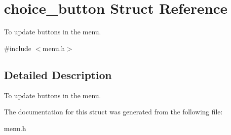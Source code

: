 \hypertarget{structchoice__button}{}\section{choice\+\_\+button Struct Reference}
\label{structchoice__button}


To update buttons in the menu.  




{\ttfamily \#include $<$menu.\+h$>$}



\subsection{Detailed Description}
To update buttons in the menu. 

The documentation for this struct was generated from the following file\+:\begin{DoxyCompactItemize}
\item 
menu.\+h\end{DoxyCompactItemize}
